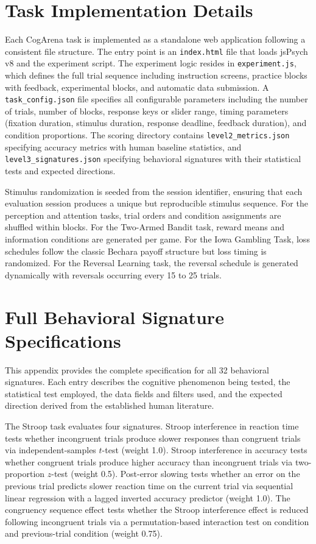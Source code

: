 \section{Task Implementation Details}
\label{app:tasks}

Each CogArena task is implemented as a standalone web application following a consistent file structure. The entry point is an \texttt{index.html} file that loads jsPsych v8 and the experiment script. The experiment logic resides in \texttt{experiment.js}, which defines the full trial sequence including instruction screens, practice blocks with feedback, experimental blocks, and automatic data submission. A \texttt{task\_config.json} file specifies all configurable parameters including the number of trials, number of blocks, response keys or slider range, timing parameters (fixation duration, stimulus duration, response deadline, feedback duration), and condition proportions. The scoring directory contains \texttt{level2\_metrics.json} specifying accuracy metrics with human baseline statistics, and \texttt{level3\_signatures.json} specifying behavioral signatures with their statistical tests and expected directions.

Stimulus randomization is seeded from the session identifier, ensuring that each evaluation session produces a unique but reproducible stimulus sequence. For the perception and attention tasks, trial orders and condition assignments are shuffled within blocks. For the Two-Armed Bandit task, reward means and information conditions are generated per game. For the Iowa Gambling Task, loss schedules follow the classic Bechara payoff structure but loss timing is randomized. For the Reversal Learning task, the reversal schedule is generated dynamically with reversals occurring every 15 to 25 trials.

\section{Full Behavioral Signature Specifications}
\label{app:signatures}

This appendix provides the complete specification for all 32 behavioral signatures. Each entry describes the cognitive phenomenon being tested, the statistical test employed, the data fields and filters used, and the expected direction derived from the established human literature.

The Stroop task evaluates four signatures. Stroop interference in reaction time tests whether incongruent trials produce slower responses than congruent trials via independent-samples $t$-test (weight 1.0). Stroop interference in accuracy tests whether congruent trials produce higher accuracy than incongruent trials via two-proportion $z$-test (weight 0.5). Post-error slowing tests whether an error on the previous trial predicts slower reaction time on the current trial via sequential linear regression with a lagged inverted accuracy predictor (weight 1.0). The congruency sequence effect tests whether the Stroop interference effect is reduced following incongruent trials via a permutation-based interaction test on condition and previous-trial condition (weight 0.75).

